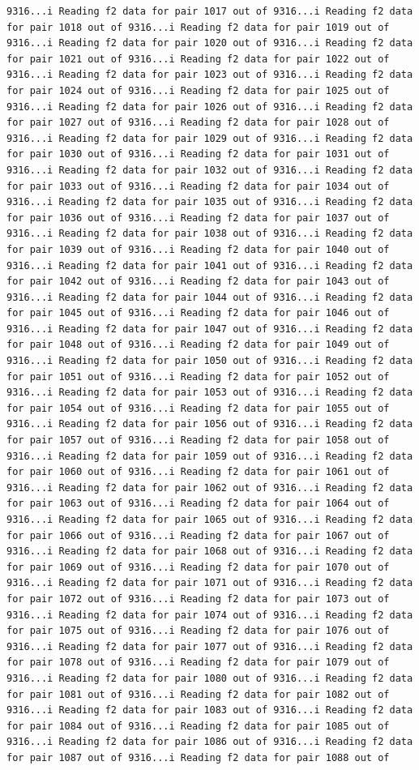 \documentclass[
]{article}
\begin{document}
\begin{verbatim}
9316...i Reading f2 data for pair 1017 out of 9316...i Reading f2 data for pair 1018 out of 9316...i Reading f2 data for pair 1019 out of 9316...i Reading f2 data for pair 1020 out of 9316...i Reading f2 data for pair 1021 out of 9316...i Reading f2 data for pair 1022 out of 9316...i Reading f2 data for pair 1023 out of 9316...i Reading f2 data for pair 1024 out of 9316...i Reading f2 data for pair 1025 out of 9316...i Reading f2 data for pair 1026 out of 9316...i Reading f2 data for pair 1027 out of 9316...i Reading f2 data for pair 1028 out of 9316...i Reading f2 data for pair 1029 out of 9316...i Reading f2 data for pair 1030 out of 9316...i Reading f2 data for pair 1031 out of 9316...i Reading f2 data for pair 1032 out of 9316...i Reading f2 data for pair 1033 out of 9316...i Reading f2 data for pair 1034 out of 9316...i Reading f2 data for pair 1035 out of 9316...i Reading f2 data for pair 1036 out of 9316...i Reading f2 data for pair 1037 out of 9316...i Reading f2 data for pair 1038 out of 9316...i Reading f2 data for pair 1039 out of 9316...i Reading f2 data for pair 1040 out of 9316...i Reading f2 data for pair 1041 out of 9316...i Reading f2 data for pair 1042 out of 9316...i Reading f2 data for pair 1043 out of 9316...i Reading f2 data for pair 1044 out of 9316...i Reading f2 data for pair 1045 out of 9316...i Reading f2 data for pair 1046 out of 9316...i Reading f2 data for pair 1047 out of 9316...i Reading f2 data for pair 1048 out of 9316...i Reading f2 data for pair 1049 out of 9316...i Reading f2 data for pair 1050 out of 9316...i Reading f2 data for pair 1051 out of 9316...i Reading f2 data for pair 1052 out of 9316...i Reading f2 data for pair 1053 out of 9316...i Reading f2 data for pair 1054 out of 9316...i Reading f2 data for pair 1055 out of 9316...i Reading f2 data for pair 1056 out of 9316...i Reading f2 data for pair 1057 out of 9316...i Reading f2 data for pair 1058 out of 9316...i Reading f2 data for pair 1059 out of 9316...i Reading f2 data for pair 1060 out of 9316...i Reading f2 data for pair 1061 out of 9316...i Reading f2 data for pair 1062 out of 9316...i Reading f2 data for pair 1063 out of 9316...i Reading f2 data for pair 1064 out of 9316...i Reading f2 data for pair 1065 out of 9316...i Reading f2 data for pair 1066 out of 9316...i Reading f2 data for pair 1067 out of 9316...i Reading f2 data for pair 1068 out of 9316...i Reading f2 data for pair 1069 out of 9316...i Reading f2 data for pair 1070 out of 9316...i Reading f2 data for pair 1071 out of 9316...i Reading f2 data for pair 1072 out of 9316...i Reading f2 data for pair 1073 out of 9316...i Reading f2 data for pair 1074 out of 9316...i Reading f2 data for pair 1075 out of 9316...i Reading f2 data for pair 1076 out of 9316...i Reading f2 data for pair 1077 out of 9316...i Reading f2 data for pair 1078 out of 9316...i Reading f2 data for pair 1079 out of 9316...i Reading f2 data for pair 1080 out of 9316...i Reading f2 data for pair 1081 out of 9316...i Reading f2 data for pair 1082 out of 9316...i Reading f2 data for pair 1083 out of 9316...i Reading f2 data for pair 1084 out of 9316...i Reading f2 data for pair 1085 out of 9316...i Reading f2 data for pair 1086 out of 9316...i Reading f2 data for pair 1087 out of 9316...i Reading f2 data for pair 1088 out of 
\end{verbatim}
\end{document}

